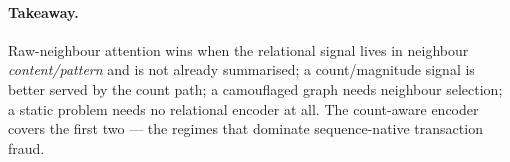 \paragraph{Takeaway.} Raw-neighbour attention wins when the relational signal lives in neighbour
\emph{content/pattern} and is not already summarised; a count/magnitude signal is better served by
the count path; a camouflaged graph needs neighbour selection; a static problem needs no relational
encoder at all. The count-aware encoder covers the first two --- the regimes that dominate
sequence-native transaction fraud.

